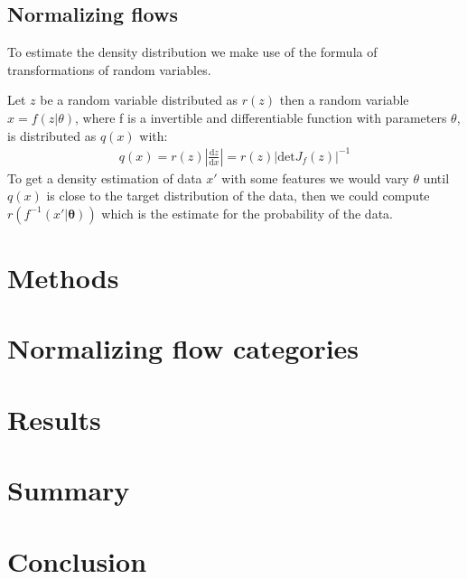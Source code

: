 \documentclass[%
 reprint,
 amsmath,amssymb,
 aps,
]{revtex4-2}
\begin{document}
\subsection{Normalizing flows}
To estimate the density distribution we make use of the formula of  transformations of random variables. 

Let $z$ be a random variable distributed as $r(z)$ then a random variable $x = f(z|\theta)$, where f is a invertible and differentiable function with parameters $\theta$, is distributed as $q(x)$ with:
\begin{align*}
	q(x) = r(z)\left|\frac{\text{d} z}{\text{d} x}\right| = r(z)\left|\text{det}J_f(z)\right|^{-1}
\end{align*}
To get a density estimation of data $x'$ with some features we would vary $\theta$ until $q(x)$ is close to the target distribution of the data, then we could compute $r(f^{-1}(x'|\mathbf{\theta}))$ which is the estimate for the probability of the data. 


\section{Methods}



\section{Normalizing flow categories}

\section{Results}

\section{Summary}

\section{Conclusion}
\end{document}
